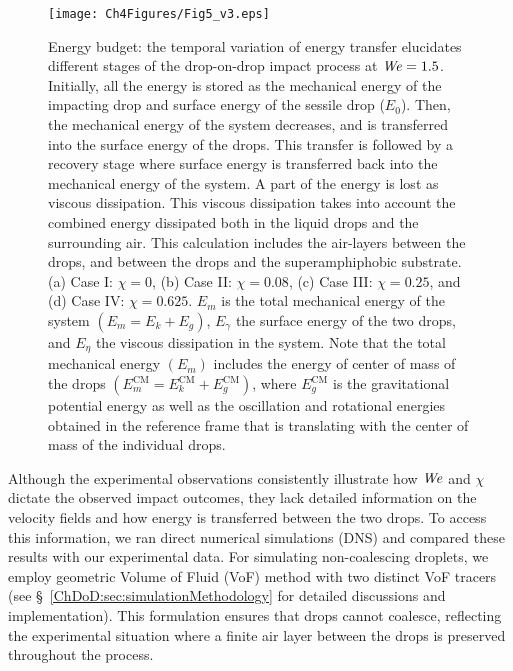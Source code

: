 \begin{figure}
	\centering
	\texttt{[image: Ch4Figures/Fig5\_v3.eps]}
	\caption{Energy budget: the temporal variation of energy transfer elucidates different stages of the drop-on-drop impact process at $\mathit{We} = 1.5$. Initially, all the energy is stored as the mechanical energy of the impacting drop and surface energy of the sessile drop ($E_0$). Then, the mechanical energy of the system decreases, and is transferred into the surface energy of the drops. This transfer is followed by a recovery stage where surface energy is transferred back into the mechanical energy of the system. A part of the energy is lost as viscous dissipation. This viscous dissipation takes into account the combined energy dissipated both in the liquid drops and the surrounding air. This calculation includes the air-layers between the drops, and between the drops and the superamphiphobic substrate. (a) Case I: $\chi = 0$, (b) Case II: $\chi = 0.08$, (c) Case III: $\chi = 0.25$, and (d) Case IV: $\chi = 0.625$. $E_m$ is the total mechanical energy of the system $\left(E_m = E_k + E_g\right)$, $E_\gamma$ the surface energy of the two drops, and $E_\eta$ the viscous dissipation in the system. Note that the total mechanical energy $\left(E_m\right)$ includes the energy of center of mass of the drops $\left(E_m^{\text{CM}} = E_k^{\text{CM}} + E_g^{\text{CM}}\right)$, where $E_g^{\text{CM}}$ is the gravitational potential energy as well as the oscillation and rotational energies obtained in the reference frame that is translating with the center of mass of the individual drops.}
	\label{ChDoD:fig5}
\end{figure}

Although the experimental observations consistently illustrate how $\mathit{We}$ and $\chi$ dictate the observed impact outcomes, they lack detailed information on the velocity fields and how energy is transferred between the two drops. To access this information, we ran direct numerical simulations (DNS) and compared these results with our experimental data. For simulating non-coalescing droplets, we employ geometric Volume of Fluid (VoF) \citep{popinet2009accurate, basiliskpopinet1} method with two distinct VoF tracers (see \S~\ref{ChDoD:sec:simulationMethodology} for detailed discussions and implementation). This formulation ensures that drops cannot coalesce, reflecting the experimental situation where a finite air layer between the drops is preserved throughout the process.

